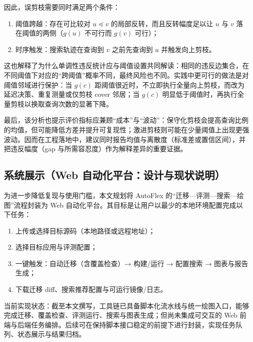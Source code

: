 \documentclass[UTF8,a4paper,12pt]{ctexart}
\numberwithin{equation}{section}
\begin{document}
因此，误剪枝需要同时满足两个条件：
\begin{enumerate}
\def\labelenumi{\arabic{enumi}.}
\item
  阈值跨越：存在可比较对 \(u\preceq v\)
  的局部反转，而且反转幅度足以让 \(u\) 与 \(v\) 落在阈值的两侧（\(g(u)\)
  不可行而 \(g(v)\) 可行）；
\item
  时序触发：搜索轨迹在查询到 \(v\) 之前先查询到 \(u\)
  并触发向上剪枝。
\end{enumerate}

这也解释了为什么单调性违反统计应与阈值设置共同解读：相同的违反边集合，在不同阈值下对应的``跨阈值''概率不同，最终风险也不同。实践中更可行的做法是对阈值邻域进行保护：当
\(g(c)\)
距阈值很近时，不立即执行全量向上剪枝，而改为延迟决策、重复测量或仅剪枝
cover 邻居；当 \(g(c)\)
明显低于阈值时，再执行全量剪枝以换取查询次数的显著下降。

最后，该分析也提示评价指标应兼顾``成本''与``波动''：保守化剪枝会提高查询比例的均值，但可能降低方差并提升可复现性；激进剪枝则可能在少量阈值上出现更强波动。因而在工程落地中，建议同时报告均值与离散度（标准差或置信区间），并把违反幅度（gap
与所需容忍度）作为解释差异的重要证据。

\subsection{系统展示（Web
自动化平台：设计与现状说明）}

为进一步降低复现与使用门槛，本文规划将 AutoFlex
的``迁移---评测---搜索---绘图''流程封装为 Web
自动化平台。其目标是让用户以最少的本地环境配置完成以下任务：
\begin{enumerate}
\def\labelenumi{\arabic{enumi}.}
\item
  上传或选择目标源码（本地路径或远程地址）；
\item
  选择目标应用与评测配置；
\item
  一键触发：自动迁移（含覆盖检查）→ 构建/运行 → 配置搜索 →
  图表与报告生成；
\item
  下载迁移 diff、搜索推荐配置与可运行镜像/日志。
\end{enumerate}

当前实现状态：截至本文撰写，工具链已具备脚本化流水线与统一绘图入口，能够完成迁移、覆盖检查、评测运行、搜索与图表生成；但尚未集成可交互的
Web
前端与后端任务编排。后续可在保持脚本接口稳定的前提下进行封装，实现任务队列、状态展示与结果归档。
\end{document}
